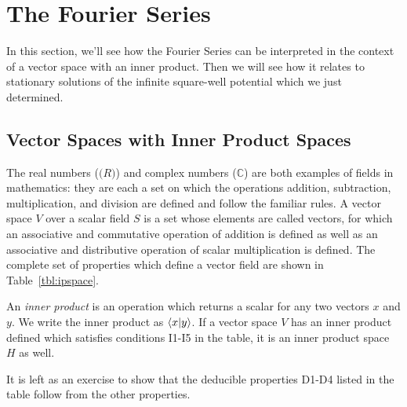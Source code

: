 \documentclass[12pt]{book}
\begin{document}
\section{The Fourier Series}

In this section, we'll see how the Fourier Series can be interpreted in the context of a vector space with an inner product.  Then we will see how it relates to stationary solutions of the infinite square-well potential which we just determined.

\subsection{Vector Spaces with Inner Product Spaces}
The real numbers ($\mathbb(R)$) and complex numbers ($\mathbb{C}$) are both examples of fields in mathematics:  they are each a set on which the operations addition, subtraction, multiplication, and division are defined and follow the familiar rules.  A vector space $V$ over a scalar field $S$ is a set whose elements are called vectors, for which an associative and commutative operation of addition is defined as well as an associative and distributive operation of scalar multiplication is defined.    The complete set of properties which define a vector field are shown in Table~\ref{tbl:ipspace}.  

An {\em inner product} is an operation which returns a scalar for any two vectors $x$ and $y$.
We write the inner product as $\braket{x|y}$.  If a vector space $V$ has an inner product defined 
which satisfies conditions I1-I5 in the table, it is an inner product space $H$ as well.  

It is left as an exercise to show that the deducible properties D1-D4 listed in the table follow from the other properties.
\end{document}
